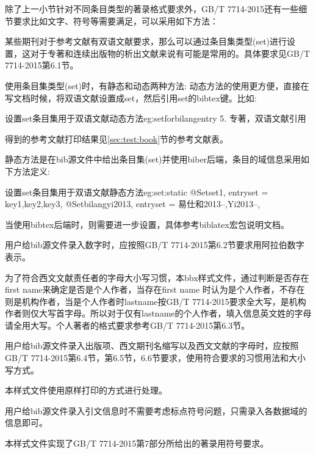 除了上一小节针对不同条目类型的著录格式要求外，GB/T 7714-2015还有一些细节要求比如文字、符号等需要满足，可以采用如下方法：

\begin{property}{}{}
某些期刊对于参考文献有双语文献要求，那么可以通过条目集类型(set)进行设置，这对于专著和连续出版物的析出文献来说有可能是常用的。具体要求见GB/T 7714-2015第6.1节。
\end{property}

使用条目集类型(set)时，有静态和动态两种方法:
动态方法的使用更方便，直接在写文档时候，将双语文献设置成set，然后引用set的bibtex键。比如:
\begin{codetex}{设置set条目集用于双语文献动态方法}{eg:setforbilangentry}
5. 专著，双语文献引用\cite{bilangyi2013}
\end{codetex}

得到的参考文献打印结果见\ref{sec:test:book}节的参考文献表。

静态方法是在bib源文件中给出条目集(set)并使用biber后端，条目的域信息采用如下方法定义:
\begin{codetex}{设置set条目集用于双语文献静态方法}{eg:set:static}
@Set{set1,
entryset = {key1,key2,key3},
}
@Set{bilangyi2013,
entryset = {易仕和2013--,Yi2013--},
}
\end{codetex}
当使用bibtex后端时，则需要进一步设置，具体参考biblatex宏包说明文档。

\begin{property}{}{}
用户给bib源文件录入数字时，应按照GB/T 7714-2015第6.2节要求用阿拉伯数字表示。

为了符合西文文献责任者的字母大小写习惯，本bbx样式文件，通过判断是否存在first name来确定是否是个人作者，当存在first name 时认为是个人作者，不存在则是机构作者，当是个人作者时lastname按GB/T 7714-2015要求全大写，是机构作者则仅大写首字母。所以对于仅有lastname的个人作者，填入信息英文姓的字母请全用大写。个人著者的格式要求参考GB/T 7714-2015第6.3节。
\end{property}

\begin{property}{}{}
用户给bib源文件录入出版项、西文期刊名缩写以及西文文献的字母时，应按照GB/T 7714-2015第6.4节，第6.5节，6.6节要求，使用符合要求的习惯用法和大小写方式。

本样式文件使用原样打印的方式进行处理。
\end{property}

\begin{property}{}{}
用户给bib源文件录入引文信息时不需要考虑标点符号问题，只需录入各数据域的信息即可。

本样式文件实现了GB/T 7714-2015第7部分所给出的著录用符号要求。
\end{property}

